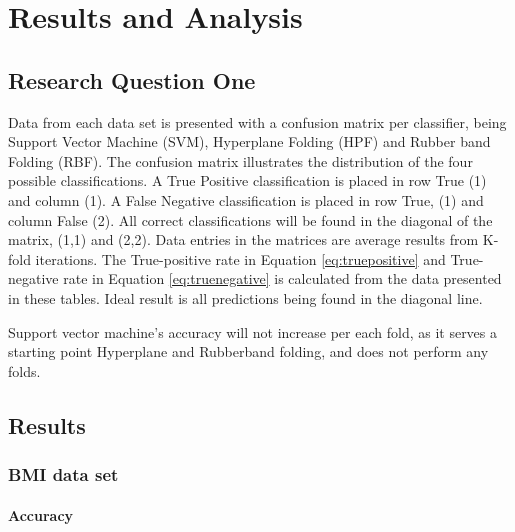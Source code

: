 \documentclass[a4paper,twoside]{bth}
\begin{document}
\chapter{Results and Analysis}
\section{Research Question One}

Data from each data set is presented with a confusion matrix per classifier, being Support Vector Machine (SVM), Hyperplane Folding (HPF) and Rubber band Folding (RBF). The confusion matrix illustrates the distribution of the four possible classifications. A True Positive classification is placed in row True (1) and column (1). A False Negative classification is placed in row True, (1) and column False (2). All correct classifications will be found in the diagonal of the matrix, (1,1) and (2,2). Data entries in the matrices are average results from K-fold iterations. The True-positive rate in Equation \ref{eq:truepositive} and True-negative rate in Equation \ref{eq:truenegative} is calculated from the data presented in these tables. Ideal result is all predictions being found in the diagonal line. \par
Support vector machine's accuracy will not increase per each fold, as it serves a starting point Hyperplane and Rubberband folding, and does not perform any folds.

\clearpage
\FloatBarrier

\section{Results}
\subsection{BMI data set}

\FloatBarrier
\subsubsection{Accuracy}
\end{document}
